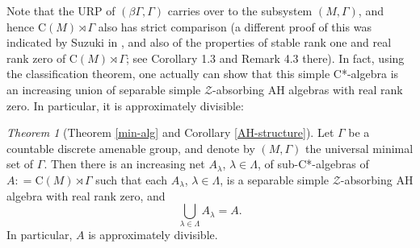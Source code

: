 \documentclass[12pt, oneside, psamsfonts]{amsart}
\theoremstyle{definition}
\theoremstyle{remark}
\numberwithin{equation}{section}
\begin{document}
Note that  the URP of $(\beta\Gamma, \Gamma)$ carries over to the subsystem $(M, \Gamma)$, and hence $\mathrm{C}(M) \rtimes \Gamma$ also has strict comparison (a different proof of this was indicated by Suzuki in \cite{Suzuki-sr1}, and also of the properties of stable rank one and real rank zero of $\mathrm{C}(M) \rtimes \Gamma$; see Corollary 1.3 and Remark 4.3 there). 
In fact, using the classification theorem, one actually can show that this simple C*-algebra is an increasing union of separable simple $\mathcal Z$-absorbing AH algebras with real rank zero. In particular, it is approximately divisible:
\theoremstyle{theorem}
\newtheorem{thmB}[thm]{Theorem}
\begin{thmB}[Theorem \ref{min-alg} and Corollary \ref{AH-structure}]
Let $\Gamma$ be a countable discrete amenable group, and denote by $(M, \Gamma)$ the universal minimal set of $\Gamma$. Then there is an increasing net $A_\lambda$, $\lambda \in \Lambda$, of sub-C*-algebras of $A: = \mathrm{C}(M) \rtimes \Gamma$ such that 
each $A_\lambda$, $\lambda \in \Lambda$, is a separable simple $\mathcal Z$-absorbing AH algebra with real rank zero, and $$\bigcup_{\lambda \in \Lambda} A_\lambda  = A. $$
In particular, $A$ is approximately divisible.
\end{thmB}


%





\end{document}

